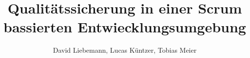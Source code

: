 \documentclass{beamer}
\title{Qualitätssicherung in einer Scrum bassierten Entwiecklungsumgebung}
\author{David Liebemann, Lucas Küntzer, Tobias Meier}
\institute{Fachhochschule Trier}
\begin{document}
\begin{frame}
\titlepage
\end{frame}

\begin{frame}

\end{frame}
\end{document}

